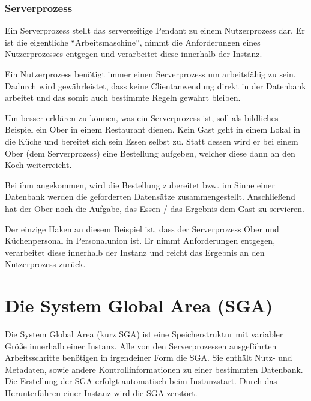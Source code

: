 
        \subsubsection{Serverprozess}
          Ein Serverprozess stellt das serverseitige Pendant zu einem Nutzerprozess dar. Er ist die eigentliche \enquote{Arbeitsmaschine}, nimmt die Anforderungen eines Nutzerprozesses entgegen und verarbeitet diese innerhalb der Instanz.

          \begin{merke}
            Ein Nutzerprozess ben\"otigt immer einen Serverprozess um arbeitsf\"ahig zu sein. Dadurch wird gew\"ahrleistet, dass keine Clientanwendung direkt in der Datenbank arbeitet und das somit auch bestimmte Regeln gewahrt bleiben.
          \end{merke}

          Um besser erkl\"aren zu k\"onnen, was ein Serverprozess ist, soll als bildliches Beispiel ein Ober in einem Restaurant dienen. Kein Gast geht in einem Lokal in die K\"uche und bereitet sich sein Essen selbst zu. Statt dessen wird er bei einem Ober (dem Serverprozess) eine Bestellung aufgeben, welcher diese dann an den Koch weiterreicht.

          Bei ihm  angekommen, wird die Bestellung zubereitet bzw. im Sinne einer Datenbank werden die geforderten Datens\"atze zusammengestellt. Anschlie\ss{}end hat der Ober noch die Aufgabe, das Essen / das Ergebnis dem Gast zu servieren.

          Der einzige Haken an diesem Beispiel ist, dass der Serverprozess Ober und K\"uchenpersonal in Personalunion ist. Er nimmt Anforderungen entgegen, verarbeitet diese innerhalb der Instanz und reicht das Ergebnis an den Nutzerprozess zur\"uck.


     \section{Die System Global Area (SGA)}
        Die System Global Area (kurz SGA) ist eine Speicherstruktur mit variabler Gr\"o\ss{}e innerhalb einer Instanz. Alle von den Serverprozessen ausgef\"uhrten Arbeitsschritte ben\"otigen in irgendeiner Form die SGA. Sie enth\"alt Nutz- und Metadaten, sowie andere Kontrollinformationen zu einer bestimmten Datenbank. Die Erstellung der SGA erfolgt automatisch beim Instanzstart. Durch das Herunterfahren einer Instanz wird die SGA zerst\"ort.

